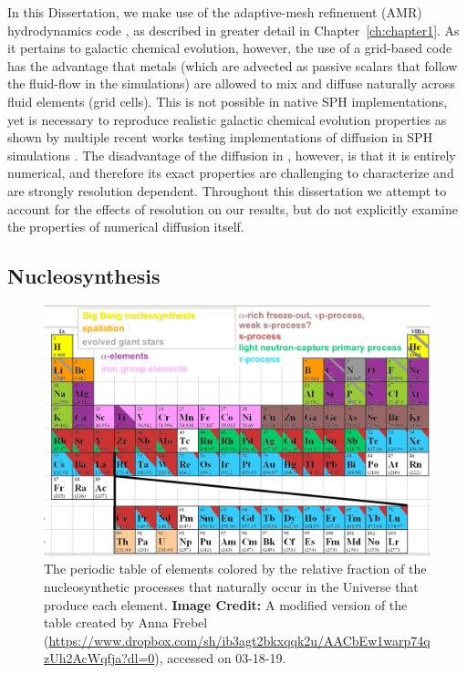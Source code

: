 In this Dissertation, we make use of the adaptive-mesh refinement (AMR) hydrodynamics code , as described in greater detail in Chapter~\ref{ch:chapter1}. As it pertains to galactic chemical evolution, however, the use of a grid-based code has the advantage that metals (which are advected as passive scalars that follow the fluid-flow in the simulations) are allowed to mix and diffuse naturally across fluid elements (grid cells). This is not possible in native SPH implementations, yet is necessary to reproduce realistic galactic chemical evolution properties as shown by multiple recent works testing implementations of diffusion in SPH simulations \citep[e.g.][]{Shen2010,Su2017a,Escala2018}. The disadvantage of the diffusion in , however, is that it is entirely numerical, and therefore its exact properties are challenging to characterize and are strongly resolution dependent. Throughout this dissertation we attempt to account for the effects of resolution on our results, but do not explicitly examine the properties of numerical diffusion itself. 


\subsection{Nucleosynthesis} \label{intro:sec:nucleosynthesis}

\begin{figure}
  \centering
  \includegraphics[width=0.75\linewidth]{./figures/intro/periodic_table}
  \caption{The periodic table of elements colored by the relative fraction of the nucleosynthetic processes that naturally occur in the Universe that produce each element. \textbf{Image Credit:} A modified version of the table created by Anna Frebel (\url{https://www.dropbox.com/sh/ib3agt2bkxqqk2u/AACbEw1warp74qzUh2AcWqfja?dl=0}), accessed on 03-18-19.}
\end{figure}

